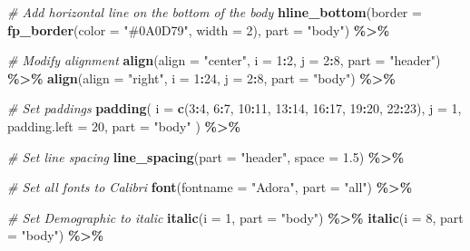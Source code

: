\documentclass[
]{article}
\newenvironment{Shaded}{\begin{snugshade}}{\end{snugshade}}
\newcommand{\AttributeTok}[1]{\textcolor[rgb]{0.13,0.29,0.53}{#1}}
\newcommand{\CommentTok}[1]{\textcolor[rgb]{0.56,0.35,0.01}{\textit{#1}}}
\newcommand{\DecValTok}[1]{\textcolor[rgb]{0.00,0.00,0.81}{#1}}
\newcommand{\FloatTok}[1]{\textcolor[rgb]{0.00,0.00,0.81}{#1}}
\newcommand{\FunctionTok}[1]{\textcolor[rgb]{0.13,0.29,0.53}{\textbf{#1}}}
\newcommand{\NormalTok}[1]{#1}
\newcommand{\SpecialCharTok}[1]{\textcolor[rgb]{0.81,0.36,0.00}{\textbf{#1}}}
\newcommand{\StringTok}[1]{\textcolor[rgb]{0.31,0.60,0.02}{#1}}
\begin{document}
\begin{Shaded}
\begin{Highlighting}[]
  \CommentTok{\# Add horizontal line on the bottom of the body}
  \FunctionTok{hline\_bottom}\NormalTok{(}\AttributeTok{border =} \FunctionTok{fp\_border}\NormalTok{(}\AttributeTok{color =} \StringTok{"\#0A0D79"}\NormalTok{, }\AttributeTok{width =} \DecValTok{2}\NormalTok{), }\AttributeTok{part =} \StringTok{"body"}\NormalTok{) }\SpecialCharTok{\%\textgreater{}\%}
  
  \CommentTok{\# Modify alignment}
  \FunctionTok{align}\NormalTok{(}\AttributeTok{align =} \StringTok{"center"}\NormalTok{, }\AttributeTok{i =} \DecValTok{1}\SpecialCharTok{:}\DecValTok{2}\NormalTok{, }\AttributeTok{j =} \DecValTok{2}\SpecialCharTok{:}\DecValTok{8}\NormalTok{, }\AttributeTok{part =} \StringTok{"header"}\NormalTok{) }\SpecialCharTok{\%\textgreater{}\%}
  \FunctionTok{align}\NormalTok{(}\AttributeTok{align =} \StringTok{"right"}\NormalTok{, }\AttributeTok{i =} \DecValTok{1}\SpecialCharTok{:}\DecValTok{24}\NormalTok{, }\AttributeTok{j =} \DecValTok{2}\SpecialCharTok{:}\DecValTok{8}\NormalTok{, }\AttributeTok{part =} \StringTok{"body"}\NormalTok{) }\SpecialCharTok{\%\textgreater{}\%}
  
  \CommentTok{\# Set paddings}
  \FunctionTok{padding}\NormalTok{(}
    \AttributeTok{i =} \FunctionTok{c}\NormalTok{(}\DecValTok{3}\SpecialCharTok{:}\DecValTok{4}\NormalTok{, }\DecValTok{6}\SpecialCharTok{:}\DecValTok{7}\NormalTok{, }\DecValTok{10}\SpecialCharTok{:}\DecValTok{11}\NormalTok{, }\DecValTok{13}\SpecialCharTok{:}\DecValTok{14}\NormalTok{, }\DecValTok{16}\SpecialCharTok{:}\DecValTok{17}\NormalTok{, }\DecValTok{19}\SpecialCharTok{:}\DecValTok{20}\NormalTok{, }\DecValTok{22}\SpecialCharTok{:}\DecValTok{23}\NormalTok{),}
    \AttributeTok{j =} \DecValTok{1}\NormalTok{,}
    \AttributeTok{padding.left =} \DecValTok{20}\NormalTok{,}
    \AttributeTok{part =} \StringTok{"body"}
\NormalTok{  ) }\SpecialCharTok{\%\textgreater{}\%}
  
  \CommentTok{\# Set line spacing}
  \FunctionTok{line\_spacing}\NormalTok{(}\AttributeTok{part =} \StringTok{"header"}\NormalTok{, }\AttributeTok{space =} \FloatTok{1.5}\NormalTok{) }\SpecialCharTok{\%\textgreater{}\%}
  
  \CommentTok{\# Set all fonts to \textquotesingle{}Calibri\textquotesingle{}}
  \FunctionTok{font}\NormalTok{(}\AttributeTok{fontname =} \StringTok{"Adora"}\NormalTok{, }\AttributeTok{part =} \StringTok{"all"}\NormalTok{) }\SpecialCharTok{\%\textgreater{}\%}
  
  \CommentTok{\# Set \textquotesingle{}Demographic\textquotesingle{} to italic}
  \FunctionTok{italic}\NormalTok{(}\AttributeTok{i =} \DecValTok{1}\NormalTok{, }\AttributeTok{part =} \StringTok{"body"}\NormalTok{) }\SpecialCharTok{\%\textgreater{}\%}
  \FunctionTok{italic}\NormalTok{(}\AttributeTok{i =} \DecValTok{8}\NormalTok{, }\AttributeTok{part =} \StringTok{"body"}\NormalTok{) }\SpecialCharTok{\%\textgreater{}\%}
  

\end{Highlighting}
\end{Shaded}
\end{document}
